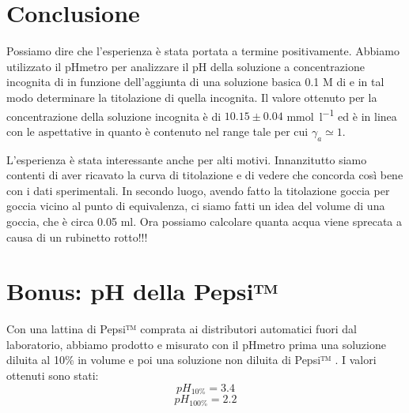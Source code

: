 \section*{Conclusione}

Possiamo dire che l'esperienza è stata portata a termine positivamente.
Abbiamo utilizzato il pHmetro per analizzare il pH della soluzione a concentrazione incognita di  in funzione dell'aggiunta di una soluzione basica 0.1 M di  e in tal modo determinare la titolazione di quella incognita.
Il valore ottenuto per la concentrazione della soluzione incognita è di $10.15 \pm 0.04$ \si{\milli\mol\per\litre} ed è in linea con le aspettative in quanto è contenuto nel range tale per cui $\gamma_{a} \simeq 1$.

L'esperienza è stata interessante anche per alti motivi. Innanzitutto siamo contenti di aver ricavato la curva
di titolazione e di vedere che concorda così bene con i dati sperimentali. In secondo luogo, avendo fatto la titolazione
goccia per goccia vicino al punto di equivalenza, ci siamo fatti un idea del volume di una goccia, che è
circa 0.05 ml. Ora possiamo calcolare quanta acqua viene sprecata a causa di un rubinetto rotto!!!

\section*{Bonus: pH della Pepsi™}

Con una lattina di Pepsi™ comprata ai distributori automatici fuori dal laboratorio, abbiamo prodotto e misurato con il pHmetro prima una soluzione diluita al 10\% in volume e poi una soluzione non diluita di Pepsi™ .
I valori ottenuti sono stati:
$$pH_{10\%} = 3.4$$
$$pH_{100\%} = 2.2$$
